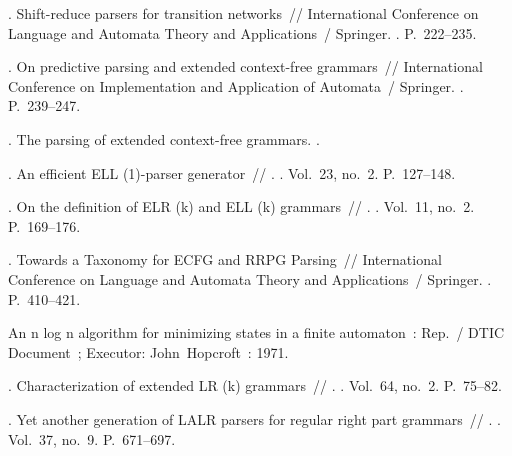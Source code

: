 \begin{thebibliography}{10}
	.
	Shift-reduce parsers for transition networks~// International Conference on
	Language and Automata Theory and Applications~/ Springer. \BibDash
	. \BibDash
	\newblock P.~222--235.
	
	. On predictive parsing and
	extended context-free grammars~// International Conference on Implementation
	and Application of Automata~/ Springer. \BibDash
	. \BibDash
	\newblock P.~239--247.
	
	. The parsing of extended
	context-free grammars. \BibDash
	.
	
	. An efficient {ELL} (1)-parser generator~//
	. \BibDash
	. \BibDash
	\newblock Vol.~23, no.~2. \BibDash
	\newblock P.~127--148.
	
	. On the definition of {ELR} (k) and ELL (k)
	grammars~// . \BibDash
	. \BibDash
	\newblock Vol.~11, no.~2. \BibDash
	\newblock P.~169--176.
	
	. Towards a Taxonomy for {ECFG} and {RRPG} Parsing~//
	International Conference on Language and Automata Theory and Applications~/
	Springer. \BibDash
	. \BibDash
	\newblock P.~410--421.
	
	An n log n algorithm for minimizing states in a finite automaton~: Rep.~/ DTIC
	Document~; Executor: John~Hopcroft~: 1971.
	
	. Characterization of extended LR (k)
	grammars~// . \BibDash
	. \BibDash
	\newblock Vol.~64, no.~2. \BibDash
	\newblock P.~75--82.
	
	. Yet another generation of {LALR}
	parsers for regular right part grammars~// .
	\BibDash
	. \BibDash
	\newblock Vol.~37, no.~9. \BibDash
	\newblock P.~671--697.
	

\end{thebibliography}
